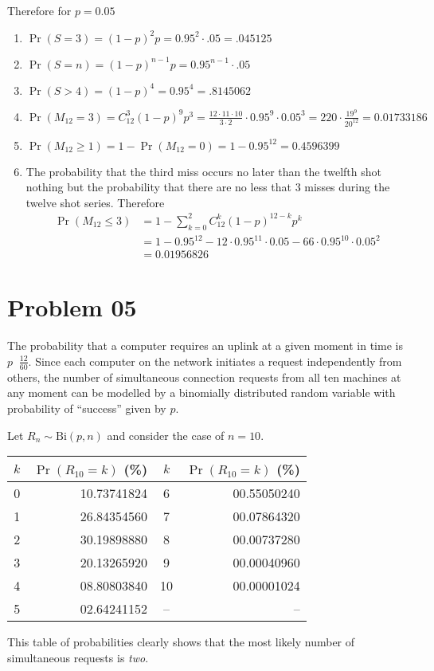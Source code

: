 \documentclass[a4paper]{article}
\newcommand{\brac}[1]{\left ( #1 \right )}
\newcommand{\defn}{\mathop{\overset{\Delta}{=}}\nolimits}
\begin{document}
Therefore for $p=0.05$
\begin{enumerate}
\item $\Pr\brac{S=3} = \brac{1-p}^2 p = {0.95}^2 \cdot .05 = .045125$
\item $\Pr\brac{S=n} = \brac{1-p}^{n-1} p = {0.95}^{n-1}  \cdot .05$
\item $\Pr\brac{S>4} = \brac{1-p}^4 = {0.95}^4 = .8145062$
\item $\Pr\brac{M_{12}=3} = C^3_{12} \brac{1-p}^9 p^3 = \frac{12\cdot11\cdot 10}{3\cdot2} \cdot {0.95}^9\cdot{0.05}^3 = 220 \cdot \frac{{19}^9}{{20}^{12}}=0.01733186$
\item $\Pr\brac{M_{12}\geq1} = 1 - \Pr\brac{M_{12} = 0} = 1-{0.95}^{12} = 0.4596399$
\item The probability that the third miss occurs no later than the twelfth shot nothing but the probability that there are no less that 3 misses during the twelve shot series. Therefore \begin{align*}\Pr\brac{M_{12}\leq3} &= 1 - \sum_{k=0}^2 C^k_{12} \brac{1-p}^{12-k} p^k \\&= 1 - {0.95}^{12} - 12 \cdot {0.95}^{11} \cdot {0.05} - 66 \cdot {0.95}^{10}\cdot{0.05}^2 \\&= 0.01956826\end{align*}
\end{enumerate}


\section{Problem 05} %
\label{sec:problem_05}

The probability that a computer requires an uplink at a given moment in time is $p\defn \frac{12}{60}$. Since each computer on the network initiates a request independently from others, the number of simultaneous connection requests from all ten machines at any moment can be modelled by a binomially distributed random variable with probability of ``success'' given by $p$.

Let $R_n\sim \text{Bi}\brac{p, n}$ and consider the case of $n=10$.
\begin{center}\begin{tabular}{ c | r || c | r }
$k$ & $\Pr\brac{R_{10}=k}$ (\%) & $k$ & $\Pr\brac{R_{10}=k}$ (\%) \\ \hline\hline
 0 & 10.73741824 	&  6 & 00.55050240 \\ \hline
 1 & 26.84354560 	&  7 & 00.07864320 \\ \hline
 2 & 30.19898880 	&  8 & 00.00737280 \\ \hline
 3 & 20.13265920 	&  9 & 00.00040960 \\ \hline
 4 & 08.80803840 	& 10 & 00.00001024 \\ \hline
 5 & 02.64241152 	& -- & -- \\ \hline
\end{tabular}\end{center}
This table of probabilities clearly shows that the most likely number of simultaneous requests is \emph{two}.
\end{document}
